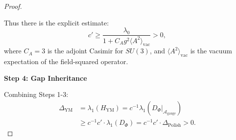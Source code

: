 \begin{theorem}
\begin{proof}
\begin{lemma}
Thus there is the explicit estimate:
\begin{equation}
c' \geq \frac{\lambda_0}{1 + C_A g^2 \langle A^2 \rangle_{\mathrm{vac}}} > 0,
\end{equation}
where $C_A = 3$ is the adjoint Casimir for $SU(3)$, and $\langle A^2 \rangle_{\mathrm{vac}}$ is the vacuum expectation of the field-squared operator.

\end{lemma}

\textbf{Step 4: Gap Inheritance}

Combining Steps 1-3:
\begin{align}
\Delta_{\mathrm{YM}} &= \lambda_1(H_{\mathrm{YM}}) = c^{-1} \lambda_1(D_\Phi|_{\mathcal{A}_{\mathrm{gauge}}}) \\
&\geq c^{-1} c' \cdot \lambda_1(D_\Phi) = c^{-1} c' \cdot \Delta_{\mathrm{Polish}} > 0.
\end{align}

\end{proof}

\end{theorem}

